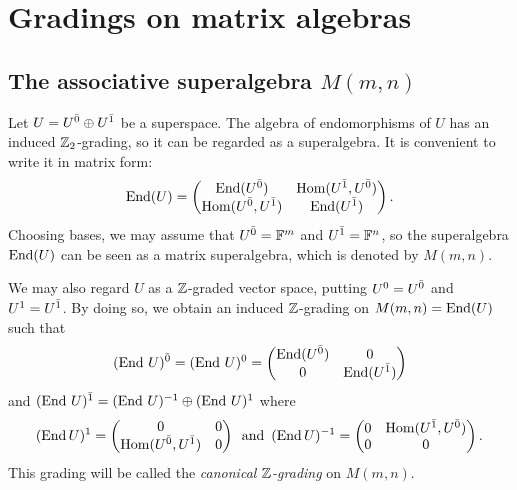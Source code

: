 \section{Gradings on matrix algebras}
\label{sec:gradings-on-matrix-algebras}


\subsection{The associative superalgebra $M(m,n)$}\label{M(m,n)}
Let $U = U^{\bar0} \oplus U^{\bar1}$ be a superspace.
The algebra of endomorphisms of $U$ has an induced $\mathbb{Z}_{2}$-grading, so it can be regarded as a superalgebra. It is convenient to write it in matrix form:
%
\begin{equation}\label{eq:End_U}
	\operatorname{End}(U) = \left(\begin{matrix}
	\operatorname{End}(U^{\bar0})       &  \operatorname{Hom}(U^{\bar1},U^{\bar0})\\
	\operatorname{Hom}(U^{\bar0},U^{\bar1}) &  \operatorname{End}(U^{\bar1})\\
	\end{matrix}
	\right).
\end{equation}
%
Choosing bases, we may assume that $U^{\bar0}=\mathbb{F}^m$ and $U^{\bar1}=\mathbb{F}^n$, so the superalgebra $\operatorname{End}(U)$ can be seen as a matrix superalgebra, which is denoted by $M(m,n)$.

We may also regard $U$ as a $\mathbb{Z}$-graded vector space, putting $U^0=U^{\bar0}$ and $U^1=U^{\bar1}$. By doing so, we obtain an induced $\mathbb{Z}$-grading on $M(m,n) = \operatorname{End} (U)$ such that
%
\[(\operatorname{End}\, U)^{\bar0} =(\operatorname{End}\, U)^0 =
	\left(\begin{matrix}
	\operatorname{End}(U^{\bar0})       &  0\\
	0                  &  \operatorname{End}(U^{\bar1})\\
	\end{matrix}
	\right)
\]
%
and $(\operatorname{End}\, U)^{\bar1} = (\operatorname{End}\, U)^{-1}\oplus (\operatorname{End}\, U)^1$ where
%
\[(\operatorname{End} U)^{1}=
	\left(\begin{matrix}
	0                  &  0\\
	\operatorname{Hom}(U^{\bar0},U^{\bar1}) &  0\\
	\end{matrix}
	\right) \,\text{ and }\, (\operatorname{End} U)^{-1}=
	\left(\begin{matrix}
	0                  &  \operatorname{Hom}(U^{\bar1},U^{\bar0})\\
	0				   &  0                 \\
	\end{matrix}
	\right).
\]
%
This grading will be called the \emph{canonical $\mathbb{Z}$-grading} on $M(m,n)$.%

